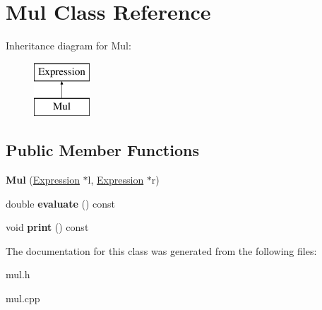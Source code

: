 \hypertarget{class_mul}{}\section{Mul Class Reference}
\label{class_mul}
Inheritance diagram for Mul\+:\begin{figure}[H]
\begin{center}
\leavevmode
\includegraphics[height=2.000000cm]{class_mul}
\end{center}
\end{figure}
\subsection*{Public Member Functions}
\begin{DoxyCompactItemize}
\item 
\mbox{\label{class_mul_a3a22b4fed252912b4795d5d48272e1aa}} 
{\bfseries Mul} (\hyperlink{class_expression}{Expression} $\ast$l, \hyperlink{class_expression}{Expression} $\ast$r)
\item 
\mbox{\label{class_mul_a3e98f760d06aaac61dda9ab57d174a35}} 
double {\bfseries evaluate} () const
\item 
\mbox{\label{class_mul_a0aa9276f2fc04dd9afc77bf47542e5ec}} 
void {\bfseries print} () const
\end{DoxyCompactItemize}


The documentation for this class was generated from the following files\+:\begin{DoxyCompactItemize}
\item 
mul.\+h\item 
mul.\+cpp\end{DoxyCompactItemize}
